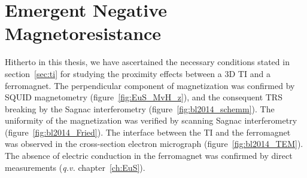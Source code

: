 \section{Emergent Negative Magnetoresistance}\label{sec:bl2014_negtive_MR}
Hitherto in this thesis, we have ascertained the necessary conditions stated in section~\ref{sec:ti} for studying the proximity effects between a 3D TI and a ferromagnet. The perpendicular component of magnetization was confirmed by SQUID magnetometry (figure~\ref{fig:EuS_MvH_z}), and the consequent TRS breaking by the Sagnac interferometry (figure~\ref{fig:bl2014_schemm}). The uniformity of the magnetization was verified by scanning Sagnac interferometry (figure~\ref{fig:bl2014_Fried}). The interface between the TI and the ferromagnet was observed in the cross-section electron micrograph (figure~\ref{fig:bl2014_TEM}). The absence of electric conduction in the ferromagnet was confirmed by direct measurements (\textit{q.v.} chapter~\ref{ch:EuS}).

